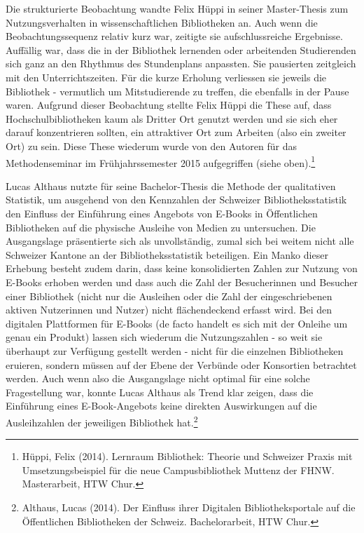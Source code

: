 \documentclass[a4paper,
fontsize=11pt,
oneside,
numbers=noperiodatend,
parskip=half-,
bibliography=totoc,
final
]{scrartcl}
\begin{document}
Die strukturierte Beobachtung wandte Felix Hüppi in seiner Master-Thesis
zum Nutzungsverhalten in wissenschaftlichen Bibliotheken an. Auch wenn
die Beobachtungssequenz relativ kurz war, zeitigte sie aufschlussreiche
Ergebnisse. Auffällig war, dass die in der Bibliothek lernenden oder
arbeitenden Studierenden sich ganz an den Rhythmus des Stundenplans
anpassten. Sie pausierten zeitgleich mit den Unterrichtszeiten. Für die
kurze Erholung verliessen sie jeweils die Bibliothek - vermutlich um
Mitstudierende zu treffen, die ebenfalls in der Pause waren. Aufgrund
dieser Beobachtung stellte Felix Hüppi die These auf, dass
Hochschulbibliotheken kaum als Dritter Ort genutzt werden und sie sich
eher darauf konzentrieren sollten, ein attraktiver Ort zum Arbeiten
(also ein zweiter Ort) zu sein. Diese These wiederum wurde von den
Autoren für das Methodenseminar im Frühjahrssemester 2015 aufgegriffen
(siehe oben).\footnote{Hüppi, Felix (2014). Lernraum Bibliothek: Theorie
  und Schweizer Praxis mit Umsetzungsbeispiel für die neue
  Campusbibliothek Muttenz der FHNW. Masterarbeit, HTW Chur.}

Lucas Althaus nutzte für seine Bachelor-Thesis die Methode der
qualitativen Statistik, um ausgehend von den Kennzahlen der Schweizer
Bibliotheksstatistik den Einfluss der Einführung eines Angebots von
E-Books in Öffentlichen Bibliotheken auf die physische Ausleihe von
Medien zu untersuchen. Die Ausgangslage präsentierte sich als
unvollständig, zumal sich bei weitem nicht alle Schweizer Kantone an der
Bibliotheksstatistik beteiligen. Ein Manko dieser Erhebung besteht zudem
darin, dass keine konsolidierten Zahlen zur Nutzung von E-Books erhoben
werden und dass auch die Zahl der Besucherinnen und Besucher einer
Bibliothek (nicht nur die Ausleihen oder die Zahl der eingeschriebenen
aktiven Nutzerinnen und Nutzer) nicht flächendeckend erfasst wird. Bei
den digitalen Plattformen für E-Books (de facto handelt es sich mit der
Onleihe um genau ein Produkt) lassen sich wiederum die Nutzungszahlen -
so weit sie überhaupt zur Verfügung gestellt werden - nicht für die
einzelnen Bibliotheken eruieren, sondern müssen auf der Ebene der
Verbünde oder Konsortien betrachtet werden. Auch wenn also die
Ausgangslage nicht optimal für eine solche Fragestellung war, konnte
Lucas Althaus als Trend klar zeigen, dass die Einführung eines
E-Book-Angebots keine direkten Auswirkungen auf die Ausleihzahlen der
jeweiligen Bibliothek hat.\footnote{Althaus, Lucas (2014). Der Einfluss
  ihrer Digitalen Bibliotheksportale auf die Öffentlichen Bibliotheken
  der Schweiz. Bachelorarbeit, HTW Chur.}
\end{document}
